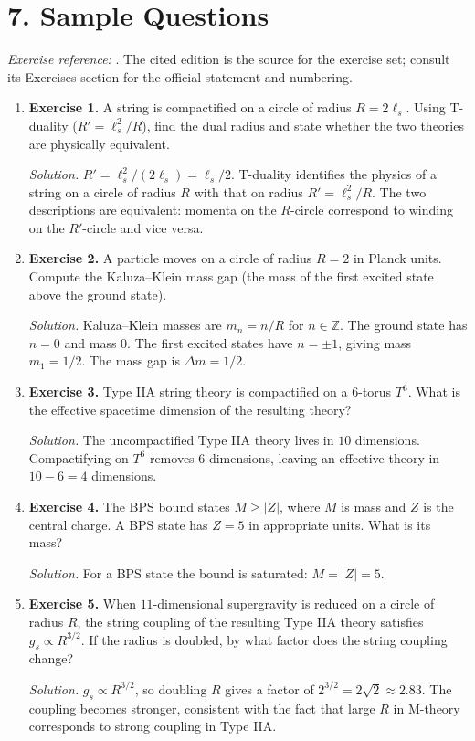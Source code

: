 \section*{7. Sample Questions}
\emph{Exercise reference:} \cite{m_theory_ref1}. The cited edition is the source for the exercise set; consult its Exercises section for the official statement and numbering.
\begin{enumerate}[leftmargin=*,itemsep=0.9em]
\item \textbf{Exercise 1.} A string is compactified on a circle of radius $R=2\ell_s$. Using T-duality ($R'=\ell_s^2/R$), find the dual radius and state whether the two theories are physically equivalent.

\emph{Solution.} $R'=\ell_s^2/(2\ell_s)=\ell_s/2$. T-duality identifies the physics of a string on a circle of radius $R$ with that on radius $R'=\ell_s^2/R$. The two descriptions are equivalent: momenta on the $R$-circle correspond to winding on the $R'$-circle and vice versa.

\item \textbf{Exercise 2.} A particle moves on a circle of radius $R=2$ in Planck units. Compute the Kaluza--Klein mass gap (the mass of the first excited state above the ground state).

\emph{Solution.} Kaluza--Klein masses are $m_n=n/R$ for $n\in\mathbb{Z}$. The ground state has $n=0$ and mass $0$. The first excited states have $n=\pm 1$, giving mass $m_1=1/2$. The mass gap is $\Delta m=1/2$.

\item \textbf{Exercise 3.} Type IIA string theory is compactified on a $6$-torus $T^6$. What is the effective spacetime dimension of the resulting theory?

\emph{Solution.} The uncompactified Type IIA theory lives in $10$ dimensions. Compactifying on $T^6$ removes $6$ dimensions, leaving an effective theory in $10-6=4$ dimensions.

\item \textbf{Exercise 4.} The BPS bound states $M\geq|Z|$, where $M$ is mass and $Z$ is the central charge. A BPS state has $Z=5$ in appropriate units. What is its mass?

\emph{Solution.} For a BPS state the bound is saturated: $M=|Z|=5$.

\item \textbf{Exercise 5.} When $11$-dimensional supergravity is reduced on a circle of radius $R$, the string coupling of the resulting Type IIA theory satisfies $g_s\propto R^{3/2}$. If the radius is doubled, by what factor does the string coupling change?

\emph{Solution.} $g_s\propto R^{3/2}$, so doubling $R$ gives a factor of $2^{3/2}=2\sqrt{2}\approx 2.83$. The coupling becomes stronger, consistent with the fact that large $R$ in M-theory corresponds to strong coupling in Type IIA.

\end{enumerate}
